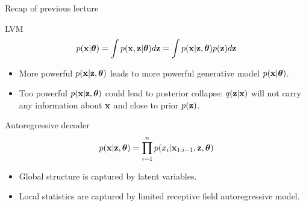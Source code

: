 

\begin{frame}
\titlepage
\end{frame}
\begin{frame}{Recap of previous lecture}
	\begin{block}{LVM}
		\vspace{-0.3cm}
		\[
		    p(\mathbf{x} | \boldsymbol{\theta}) = \int p(\mathbf{x}, \mathbf{z} | \boldsymbol{\theta}) d \mathbf{z} = \int p(\mathbf{x} | \mathbf{z}, \boldsymbol{\theta}) p(\mathbf{z}) d \mathbf{z} 
		\]
		\vspace{-0.3cm}
	\end{block}
	\begin{itemize}
		\item More powerful $p(\mathbf{x} | \mathbf{z}, \boldsymbol{\theta})$ leads to more powerful generative model $p(\mathbf{x} | \boldsymbol{\theta})$.
		\item Too powerful $p(\mathbf{x} | \mathbf{z}, \boldsymbol{\theta})$ could lead to posterior collapse: $q(\mathbf{z} | \mathbf{x})$ will not carry any information about $\mathbf{x}$ and close to prior $p(\mathbf{z})$.
	\end{itemize}
	\begin{block}{Autoregressive decoder}
		\vspace{-0.2cm}
		\[
		    p(\mathbf{x} | \mathbf{z} , \boldsymbol{\theta}) = \prod_{i=1}^n p(x_i | \mathbf{x}_{1:i - 1}, \mathbf{z} , \boldsymbol{\theta})
		\]
	\end{block}
	\begin{itemize}
		\item Global structure is captured by latent variables.
		\item Local statistics are captured by limited receptive field autoregressive model.
	\end{itemize}
	
\end{frame}
